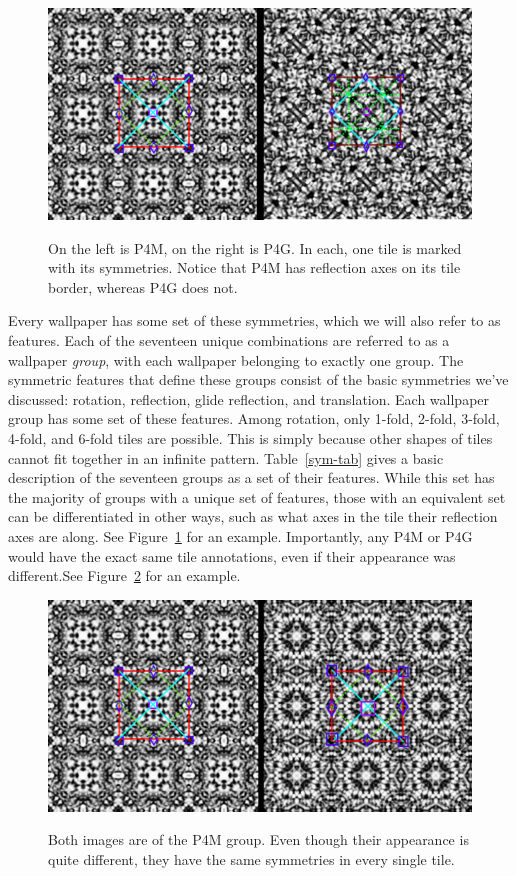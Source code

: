 \begin{figure}[!ht]
\centering
\includegraphics[width=0.9\columnwidth]{ann_images}
\label{P4GvP4M}
\caption{On the left is P4M, on the right is P4G. In each, one tile is marked with its symmetries. Notice that P4M has reflection axes on its tile border, whereas P4G does not.}
\end{figure}

Every wallpaper has some set of these symmetries, which we will also refer to as features. Each of the seventeen unique combinations are referred to as a wallpaper \textit{group}, with each wallpaper belonging to exactly one group. The symmetric features that define these groups consist of the basic symmetries we've discussed: rotation, reflection, glide reflection, and translation. Each wallpaper group has some set of these features. Among rotation, only 1-fold, 2-fold, 3-fold, 4-fold, and 6-fold tiles are possible. This is simply because other shapes of tiles cannot fit together in an infinite pattern. Table~\ref{sym-tab} gives a basic description of the seventeen groups as a set of their features. While this set has the majority of groups with a unique set of features, those with an equivalent set can be differentiated in other ways, such as what axes in the tile their reflection axes are along. See Figure~\ref{P4GvP4M} for an example. Importantly, any P4M or P4G would have the exact same tile annotations, even if their appearance was different.See Figure~\ref{P4MvP4M} for an example.



\begin{figure}[!ht]
\centering
\includegraphics[width=0.9\columnwidth]{ann_images_same}
\label{P4MvP4M}
\caption{Both images are of the P4M group. Even though their appearance is quite different, they have the same symmetries in every single tile. }
\end{figure}

